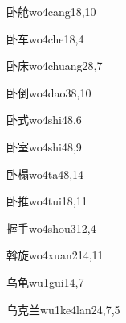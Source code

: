 \begin{verbete}{卧舱}{wo4cang1}{8,10}
\end{verbete}

\begin{verbete}{卧车}{wo4che1}{8,4}
\end{verbete}

\begin{verbete}{卧床}{wo4chuang2}{8,7}
\end{verbete}

\begin{verbete}{卧倒}{wo4dao3}{8,10}
\end{verbete}

\begin{verbete}{卧式}{wo4shi4}{8,6}
\end{verbete}

\begin{verbete}{卧室}{wo4shi4}{8,9}
\end{verbete}

\begin{verbete}{卧榻}{wo4ta4}{8,14}
\end{verbete}

\begin{verbete}{卧推}{wo4tui1}{8,11}
\end{verbete}

\begin{verbete}{握手}{wo4shou3}{12,4}
\end{verbete}

\begin{verbete}{斡旋}{wo4xuan2}{14,11}
\end{verbete}

\begin{verbete}{乌龟}{wu1gui1}{4,7}
\end{verbete}

\begin{verbete}{乌克兰}{wu1ke4lan2}{4,7,5}
\end{verbete}

